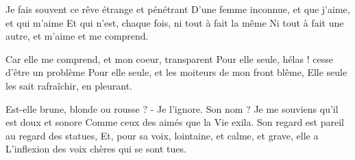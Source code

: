 \documentclass{article}
\begin{document}
\begin{poem}
\begin{stanza}
Je fais souvent ce rêve étrange et pénétrant\verseline
D'une femme inconnue, et que j'aime, et qui m'aime \verseline
Et qui n'est, chaque fois, ni tout à fait la même\verseline
Ni tout à fait une autre, et m'aime et me comprend.
\end{stanza}
\begin{stanza}
Car elle me comprend, et mon coeur, transparent \verseline
Pour elle seule, hélas ! cesse d'être un problème \verseline
Pour elle seule, et les moiteurs de mon front blême, \verseline
Elle seule les sait rafraîchir, en pleurant.
\end{stanza}
\begin{stanza}
Est-elle brune, blonde ou rousse ? - Je l'ignore. \verseline
Son nom ? Je me souviens qu'il est doux et sonore \verseline
Comme ceux des aimés que la Vie exila.\verseline
Son regard est pareil au regard des statues, \verseline
Et, pour sa voix, lointaine, et calme, et grave, elle a \verseline
L'inflexion des voix chères qui se sont tues.
\end{stanza}
\end{poem}
\end{document}
